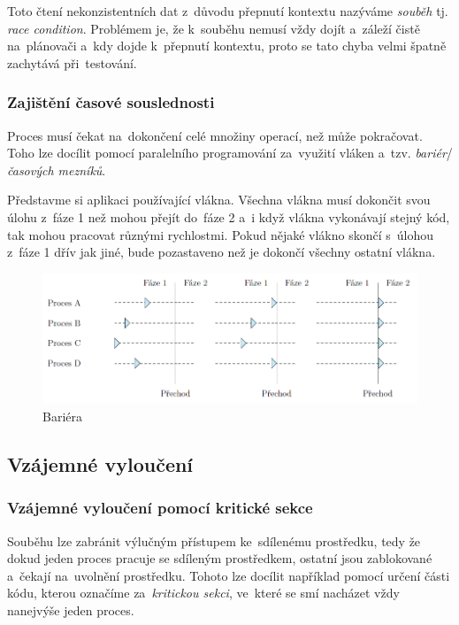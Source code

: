 Toto čtení nekonzistentních dat z~důvodu přepnutí kontextu nazýváme \emph{souběh} tj. \emph{race condition}. Problémem je, že k~souběhu nemusí vždy dojít a~záleží čistě na~plánovači a~kdy dojde k~přepnutí kontextu, proto se tato chyba velmi špatně zachytává při~testování.

\subsubsection{Zajištění časové souslednosti}

Proces musí čekat na~dokončení celé množiny operací, než může pokračovat. Toho lze docílit pomocí paralelního programování za~využití vláken a~tzv. \emph{bariér}/\emph{časových mezníků}.

Představme si aplikaci používající vlákna. Všechna vlákna musí dokončit svou úlohu z~fáze 1 než mohou přejít do~fáze 2 a~i když vlákna vykonávají stejný kód, tak mohou pracovat různými rychlostmi. Pokud nějaké vlákno skončí s~úlohou z~fáze 1 dřív jak jiné, bude pozastaveno než je dokončí všechny ostatní vlákna.

\begin{figure}[ht]
	\centering
	\includegraphics[width=\textwidth]{images/proc_barrier.png}
	\caption{Bariéra}
	\label{proc_barrier}
\end{figure}

\subsection{Vzájemné vyloučení}

\subsubsection{Vzájemné vyloučení pomocí kritické sekce}

Souběhu lze zabránit výlučným přístupem ke~sdílenému prostředku, tedy že dokud jeden proces pracuje se sdíleným prostředkem, ostatní jsou zablokované a~čekají na~uvolnění prostředku. Tohoto lze docílit například pomocí určení části kódu, kterou označíme za~\emph{kritickou sekci}, ve~které se smí nacházet vždy nanejvýše jeden proces.


